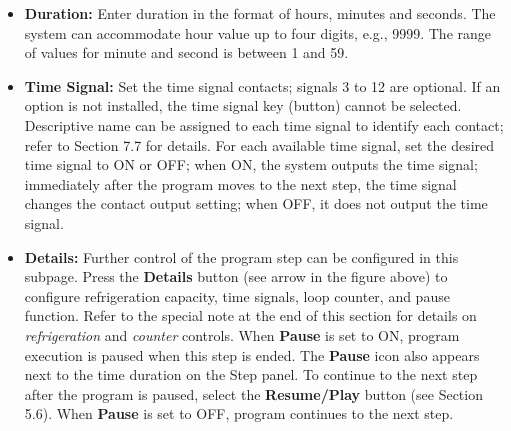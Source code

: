 \begin{enumerate}
\begin{itemize}
    \textbf{Soak Ctrl:} When selected for temperature, soak time control
    will maintain operation at the temperature set point. When soak time
    control is set to ON, after the operation of the step is started,
    the equipment waits until the process value reaches the control
    attainment range, and it then starts counting the time. Thus, the
    soak time in the temperature set point is the same as the setting
    time. If disabled, the system does not perform soak time control,
    and the counting starts at the same time as the start of the step
    operation. \textbf{\emph{Note:}} Soak control and ramp control
    cannot be performed together simultaneously. One or the other can be
    enabled, not both. If \textbf{Soak Ctrl} is selected, \textbf{Ramp
    Ctrl} which was previously selected will be disabled (deselected).\\
  \item
    \textbf{Duration:} Enter duration in the format of hours, minutes
    and seconds. The system can accommodate hour value up to four
    digits, e.g., 9999. The range of values for minute and second is
    between 1 and 59.
  \item
    \textbf{Time Signal:} Set the time signal contacts; signals 3 to 12
    are optional. If an option is not installed, the time signal key
    (button) cannot be selected. Descriptive name can be assigned to
    each time signal to identify each contact; refer to Section 7.7 for
    details. For each available time signal, set the desired time signal
    to ON or OFF; when ON, the system outputs the time signal;
    immediately after the program moves to the next step, the time
    signal changes the contact output setting; when OFF, it does not
    output the time signal.\\
  \item
    \textbf{Details:} Further control of the program step can be
    configured in this subpage. Press the \textbf{Details} button (see
    arrow in the figure above) to configure refrigeration capacity, time
    signals, loop counter, and pause function. Refer to the special note
    at the end of this section for details on \emph{refrigeration} and
    \emph{counter} controls. When \textbf{Pause} is set to ON, program
    execution is paused when this step is ended. The \textbf{Pause} icon
    also appears next to the time duration on the Step panel. To
    continue to the next step after the program is paused, select the
    \textbf{Resume/Play} button (see Section 5.6). When \textbf{Pause}
    is set to OFF, program continues to the next step.

\end{itemize}
\end{enumerate}
